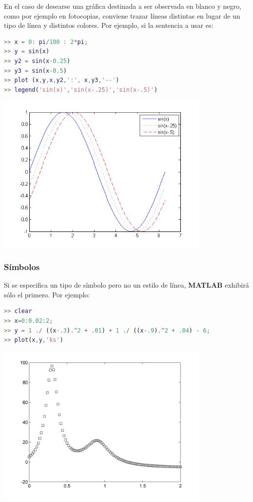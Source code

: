 En el caso de desearse una gráfica destinada a ser observada en blanco y negro, como por ejemplo  en fotocopias, conviene trazar líneas distintas en lugar de un tipo de línea y 
distintos colores. Por ejemplo, si la sentencia a usar es:

\begin{lstlisting}[language=Matlab]
>> x = 0: pi/100 : 2*pi; 
>> y = sin(x) 
>> y2 = sin(x-0.25) 
>> y3 = sin(x-0.5) 
>> plot (x,y,x,y2,':', x,y3,'--')
>> legend('sin(x)','sin(x-.25)','sin(x-.5)')
\end{lstlisting}
\begin{center}
\includegraphics[width=300pt]{./Imagenes/senovariosmarca.png}
\end{center}

\subsubsection{Símbolos}

Si se especifica un tipo de símbolo pero no un estilo de línea, \textbf{MATLAB} exhibirá sólo el primero. Por ejemplo:

\begin{lstlisting}[language=Matlab]
>> clear 
>> x=0:0.02:2; 
>> y = 1 ./ ((x-.3).^2 + .01) + 1 ./ ((x-.9).^2 + .04) - 6; 
>> plot(x,y,'ks') 
\end{lstlisting}
\begin{center}
\includegraphics[width=300pt]{./Imagenes/simbolo1.png}
\end{center}

